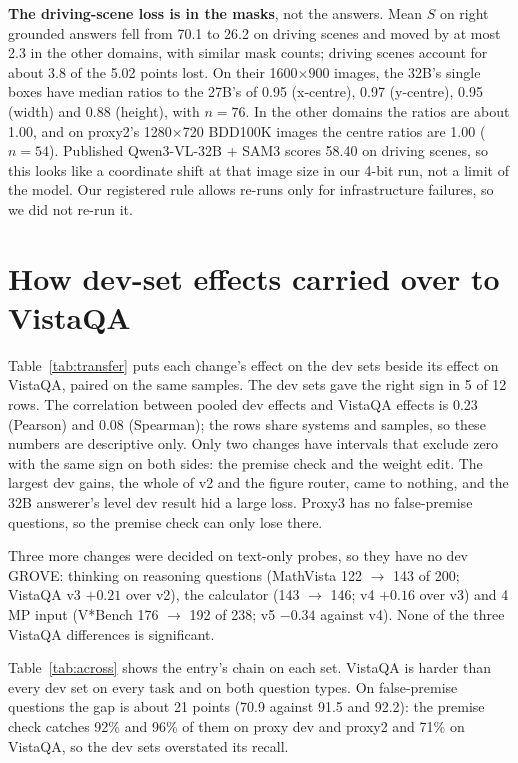 \documentclass{article}
\begin{document}
\textbf{The driving-scene loss is in the masks}, not the answers. Mean $S$ on right grounded answers fell from 70.1 to 26.2 on driving
scenes and moved by at most 2.3 in the other domains, with similar mask counts; driving scenes account for about 3.8 of the 5.02
points lost. On their 1600$\times$900 images, the 32B's single boxes have median ratios to the 27B's of 0.95 (x-centre), 0.97
(y-centre), 0.95 (width) and 0.88 (height), with $n=76$. In the other domains the ratios are about 1.00, and on proxy2's
1280$\times$720 BDD100K images the centre ratios are 1.00 ($n=54$). Published Qwen3-VL-32B + SAM3 scores 58.40 on driving scenes, so
this looks like a coordinate shift at that image size in our 4-bit run, not a limit of the model. Our registered rule allows re-runs
only for infrastructure failures, so we did not re-run it.

\section{How dev-set effects carried over to VistaQA}\label{app:transfer}
Table~\ref{tab:transfer} puts each change's effect on the dev sets beside its effect on VistaQA, paired on the same samples. The dev
sets gave the right sign in 5 of 12 rows. The correlation between pooled dev effects and VistaQA effects is 0.23 (Pearson) and 0.08
(Spearman); the rows share systems and samples, so these numbers are descriptive only. Only two changes have intervals that exclude
zero with the same sign on both sides: the premise check and the weight edit. The largest dev gains, the whole of v2 and the figure
router, came to nothing, and the 32B answerer's level dev result hid a large loss. Proxy3 has no false-premise questions, so the premise
check can only lose there.

Three more changes were decided on text-only probes, so they have no dev GROVE: thinking on reasoning questions (MathVista 122 $\to$
143 of 200; VistaQA v3 $+0.21$ over v2), the calculator (143 $\to$ 146; v4 $+0.16$ over v3) and 4\,MP input (V*Bench 176 $\to$ 192 of
238; v5 $-0.34$ against v4). None of the three VistaQA differences is significant.

Table~\ref{tab:across} shows the entry's chain on each set. VistaQA is harder than every dev set on every task and on both question
types. On false-premise questions the gap is about 21 points (70.9 against 91.5 and 92.2): the premise check catches 92\% and 96\% of
them on proxy dev and proxy2 and 71\% on VistaQA, so the dev sets overstated its recall.
\end{document}
